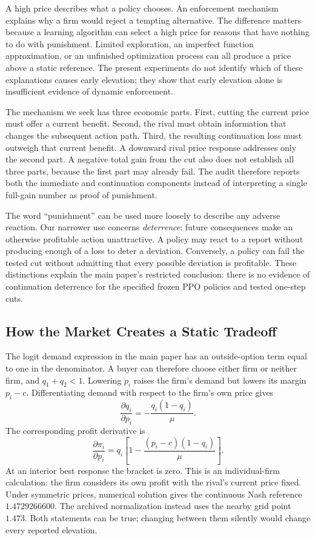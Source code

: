 \documentclass{article}
\begin{document}
A high price describes what a policy chooses. An enforcement mechanism explains why a firm would reject a tempting alternative. The difference matters because a learning algorithm can select a high price for reasons that have nothing to do with punishment. Limited exploration, an imperfect function approximation, or an unfinished optimization process can all produce a price above a static reference. The present experiments do not identify which of these explanations causes early elevation; they show that early elevation alone is insufficient evidence of dynamic enforcement.

The mechanism we seek has three economic parts. First, cutting the current price must offer a current benefit. Second, the rival must obtain information that changes the subsequent action path. Third, the resulting continuation loss must outweigh that current benefit. A downward rival price response addresses only the second part. A negative total gain from the cut also does not establish all three parts, because the first part may already fail. The audit therefore reports both the immediate and continuation components instead of interpreting a single full-gain number as proof of punishment.

The word ``punishment'' can be used more loosely to describe any adverse reaction. Our narrower use concerns \emph{deterrence}: future consequences make an otherwise profitable action unattractive. A policy may react to a report without producing enough of a loss to deter a deviation. Conversely, a policy can fail the tested cut without admitting that every possible deviation is profitable. These distinctions explain the main paper's restricted conclusion: there is no evidence of continuation deterrence for the specified frozen PPO policies and tested one-step cuts.

\subsection{How the Market Creates a Static Tradeoff}

The logit demand expression in the main paper has an outside-option term equal to one in the denominator. A buyer can therefore choose either firm or neither firm, and $q_1+q_2<1$. Lowering $p_i$ raises the firm's demand but lowers its margin $p_i-c$. Differentiating demand with respect to the firm's own price gives
\[
\frac{\partial q_i}{\partial p_i}=-\frac{q_i(1-q_i)}{\mu}.
\]
The corresponding profit derivative is
\[
\frac{\partial\pi_i}{\partial p_i}
=q_i\left[1-\frac{(p_i-c)(1-q_i)}{\mu}\right].
\]
At an interior best response the bracket is zero. This is an individual-firm calculation: the firm considers its own profit with the rival's current price fixed. Under symmetric prices, numerical solution gives the continuous Nash reference $1.4729266600$. The archived normalization instead uses the nearby grid point $1.473$. Both statements can be true; changing between them silently would change every reported elevation.
\end{document}
